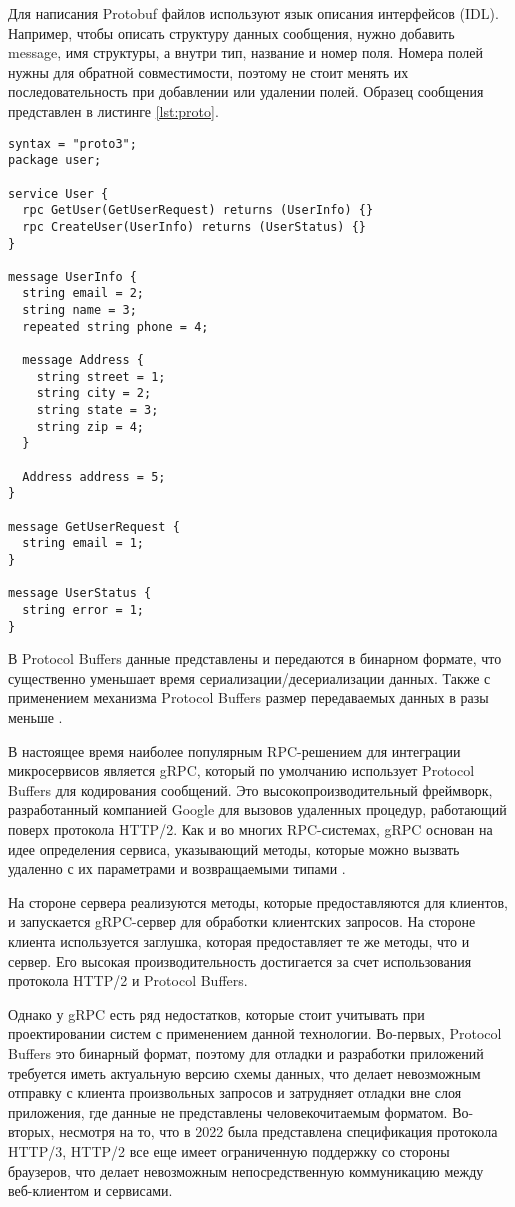 Для написания Protobuf файлов используют язык описания интерфейсов (IDL).
Например, чтобы описать структуру данных сообщения, нужно добавить message, имя структуры, а внутри тип, название и номер поля. Номера полей нужны для обратной совместимости, поэтому не стоит менять их последовательность при добавлении или удалении полей. Образец сообщения представлен в листинге \ref{lst:proto}.
\begin{lstlisting}[caption={Сетевые хендлеры, осуществляющие основую логику},label=lst:proto,captionpos=b] 
syntax = "proto3";
package user;

service User {
  rpc GetUser(GetUserRequest) returns (UserInfo) {}
  rpc CreateUser(UserInfo) returns (UserStatus) {}
}

message UserInfo {
  string email = 2;
  string name = 3;
  repeated string phone = 4;

  message Address {
    string street = 1;
    string city = 2;
    string state = 3;
    string zip = 4;
  }

  Address address = 5;
}

message GetUserRequest {
  string email = 1;
}

message UserStatus {
  string error = 1;
}
\end{lstlisting}


В Protocol Buffers данные представлены и передаются в
бинарном формате, что существенно уменьшает время сериализации/десериализации
данных. Также с применением механизма Protocol Buffers размер передаваемых данных в разы меньше \cite{Bolanowski_2022}.

В настоящее время наиболее популярным RPC-решением для интеграции
микросервисов является gRPC, который по умолчанию использует Protocol Buffers для кодирования сообщений. Это высокопроизводительный фреймворк, разработанный компанией Google для вызовов удаленных процедур, работающий поверх протокола
HTTP/2. Как и во многих RPC-системах, gRPC основан на идее определения сервиса,
указывающий методы, которые можно вызвать удаленно с их параметрами и
возвращаемыми типами \cite{grpc}.

На стороне сервера реализуются методы, которые предоставляются для клиентов, и
запускается gRPC-сервер для обработки клиентских запросов. На стороне клиента
используется заглушка, которая предоставляет те же методы, что и сервер. Его высокая производительность достигается за счет использования протокола HTTP/2 и Protocol Buffers.

Однако у gRPC есть ряд недостатков, которые стоит учитывать при проектировании систем с применением данной технологии. Во-первых, Protocol Buffers это бинарный формат, поэтому для отладки и разработки приложений требуется иметь актуальную версию схемы данных, что делает невозможным отправку с клиента произвольных запросов и затрудняет отладки вне слоя приложения, где данные не представлены человекочитаемым форматом. Во-вторых, несмотря на то, что в 2022 была представлена спецификация протокола HTTP/3, HTTP/2 все еще имеет ограниченную поддержку со стороны браузеров, что делает невозможным непосредственную коммуникацию между веб-клиентом и сервисами. 

